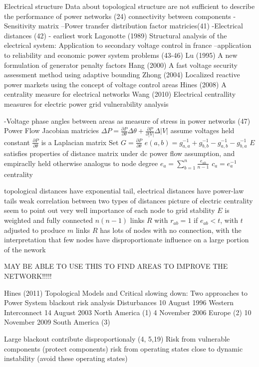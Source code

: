 Electrical structure
Data about topological structure are not sufficient to describe the performance of power networks (24)
connectivity between components
-Sensitivity matrix
--Power transfer distribution factor matricies(41)
-Electrical distances (42) - earliest work
Lagonotte (1989) Structural analysis of the electrical system: Application to secondary voltage control in france
--application to reliability and economic power system problems (43-46)
Lu (1995) A new formulation of generator penalty factors
Hang (2000) A fast voltage security assessment method using adaptive bounding
Zhong (2004) Localized reactive power markets using the concept of voltage control areas
Hines (2008) A centrality measure for electrical networks
Wang (2010) Electrical centrallity measures for electric power grid vulnerability analysis

-Voltage phase angles between areas as measure of stress in power networks (47)
Power Flow Jacobian matricies
$ \Delta P = \frac{ \partial P }{ \partial \theta} \Delta \theta + \frac{ \partial P }{ \partial | V | } \Delta | V |$
assume voltages held constant
$\frac{ \partial P }{ \partial \theta} $ is a Laplacian matrix
Set $G = \frac{ \partial P }{ \partial \theta} $
$e(a,b) = g_{a,a}^{-1} + g_{b,b}^{-1} - g_{a,b}^{-1} - g_{b,a}^{-1}$
$E$ satisfies properties of distance matrix under dc power flow assumption, and empiraclly held otherwise
analogus to node degree
$e_a = \sum_{b=1}^n \frac{e_{ab}}{n-1}$
$c_a = e_a^{-1}$ centrality

topological distances have exponential tail, electrical distances have power-law tails
weak correlation between two types of distances
picture of electric centrality seem to point out very well importance of each node to grid stability
$E$ is weighted and fully connected $n(n-1)$ links
$R$ with $r_{ab} = 1 $ if $e_{ab} < t$, with $t $ adjusted to produce $m$ links
$R$ has lots of nodes with no connection, with the interpretation that few nodes have disproportionate influence on a large portion of the nework

MAY BE ABLE TO USE THIS TO FIND AREAS TO IMPROVE THE NETWORK!!!!!

Hines (2011) Topological Models and Critical slowing down: Two approaches to Power System blackout risk analysis
Disturbances
10 August 1996 Western Interconnect
14 August 2003 North America (1)
4 November 2006 Europe (2)
10 November 2009 South America (3)

Large blackout contribute disproportionaly (4, 5,19)
Risk from vulnerable components (protect components)
risk from operating states close to dynamic instability (avoid these operating states)


